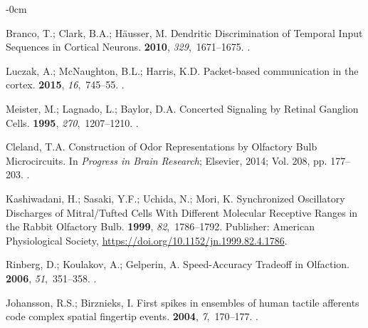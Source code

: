 \documentclass[brainsci, %
               review,submit,pdftex,moreauthors
               ]{Definitions/mdpi}
\begin{document}
\begin{adjustwidth}{-\extralength}{0cm}
\begin{thebibliography}{999}
  Branco, T.; Clark, B.A.; Häusser, M.
  \newblock Dendritic {Discrimination} of {Temporal} {Input} {Sequences} in
    {Cortical} {Neurons}.
   {\bf 2010}, {\em 329},~1671--1675.
  .
  
  Luczak, A.; McNaughton, B.L.; Harris, K.D.
  \newblock Packet-based communication in the cortex.
   {\bf 2015}, {\em 16},~745--55.
  .
  
  Meister, M.; Lagnado, L.; Baylor, D.A.
  \newblock Concerted {Signaling} by {Retinal} {Ganglion} {Cells}.
   {\bf 1995}, {\em 270},~1207--1210.
  .
  
  Cleland, T.A.
  \newblock Construction of {Odor} {Representations} by {Olfactory} {Bulb}
    {Microcircuits}. In {\em Progress in {Brain} {Research}}; Elsevier,  2014;
    Vol. 208, pp. 177--203.
  .
  
  Kashiwadani, H.; Sasaki, Y.F.; Uchida, N.; Mori, K.
  \newblock Synchronized {Oscillatory} {Discharges} of {Mitral}/{Tufted} {Cells}
    {With} {Different} {Molecular} {Receptive} {Ranges} in the {Rabbit}
    {Olfactory} {Bulb}.
   {\bf 1999}, {\em 82},~1786--1792.
  \newblock Publisher: American Physiological Society,
    {\url{https://doi.org/10.1152/jn.1999.82.4.1786}}.
  
  Rinberg, D.; Koulakov, A.; Gelperin, A.
  \newblock Speed-{Accuracy} {Tradeoff} in {Olfaction}.
   {\bf 2006}, {\em 51},~351--358.
  .
  
  Johansson, R.S.; Birznieks, I.
  \newblock First spikes in ensembles of human tactile afferents code complex
    spatial fingertip events.
   {\bf 2004}, {\em 7},~170--177.
  .
  

\end{thebibliography}
\end{adjustwidth}
\end{document}
